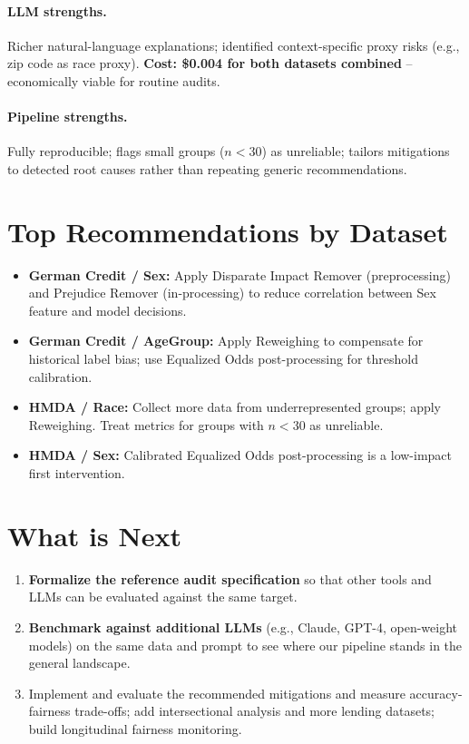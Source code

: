 \documentclass[11pt,a4paper]{article}
\begin{document}
\paragraph{LLM strengths.} Richer natural-language explanations; identified
context-specific proxy risks (e.g., zip code as race proxy). \textbf{Cost:
\$0.004 for both datasets combined} -- economically viable for routine audits.

\paragraph{Pipeline strengths.} Fully reproducible; flags small groups
($n<30$) as unreliable; tailors mitigations to detected root causes rather than
repeating generic recommendations.

\section*{Top Recommendations by Dataset}

\begin{itemize}[nosep, leftmargin=*]
  \item \textbf{German Credit / Sex:} Apply Disparate Impact Remover
        (preprocessing) and Prejudice Remover (in-processing) to reduce
        correlation between Sex feature and model decisions.
  \item \textbf{German Credit / AgeGroup:} Apply Reweighing to compensate for
        historical label bias; use Equalized Odds post-processing for threshold
        calibration.
  \item \textbf{HMDA / Race:} Collect more data from underrepresented groups;
        apply Reweighing. Treat metrics for groups with $n<30$ as unreliable.
  \item \textbf{HMDA / Sex:} Calibrated Equalized Odds post-processing is a
        low-impact first intervention.
\end{itemize}

\section*{What is Next}

\begin{enumerate}[nosep, leftmargin=*]
  \item \textbf{Formalize the reference audit specification} so that other
        tools and LLMs can be evaluated against the same target.
  \item \textbf{Benchmark against additional LLMs} (e.g., Claude, GPT-4,
        open-weight models) on the same data and prompt to see where our
        pipeline stands in the general landscape.
  \item Implement and evaluate the recommended mitigations and measure
        accuracy-fairness trade-offs; add intersectional analysis and more
        lending datasets; build longitudinal fairness monitoring.
\end{enumerate}
\end{document}
